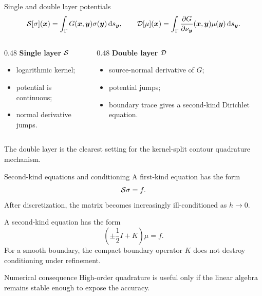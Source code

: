 \documentclass[aspectratio=169,11pt]{beamer}
\newcommand{\dd}{\,\mathrm d}
\newcommand{\x}{\bm{x}}
\newcommand{\y}{\bm{y}}
\begin{document}
\begin{frame}{Single and double layer potentials}
\small
\[
  \Sop[\sigma](\x)
  =
  \int_\Gamma G(\x,\y)\sigma(\y)\dd s_{\y},
  \qquad
  \Dop[\mu](\x)
  =
  \int_\Gamma
  \frac{\partial G}{\partial \nu_{\y}}(\x,\y)\mu(\y)\dd s_{\y}.
\]

\begin{columns}[T,totalwidth=\textwidth]
\begin{column}{0.48\textwidth}
\textbf{Single layer $\mathcal{S}$}
\begin{itemize}
  \item logarithmic kernel;
  \item potential is continuous;
  \item normal derivative jumps.
\end{itemize}
\end{column}
\begin{column}{0.48\textwidth}
\textbf{Double layer $\mathcal{D}$}
\begin{itemize}
  \item source-normal derivative of $G$;
  \item potential jumps;
  \item boundary trace gives a second-kind Dirichlet equation.
\end{itemize}
\end{column}
\end{columns}

\vspace{3mm}
The double layer is the clearest setting for the kernel-split contour
quadrature mechanism.
\end{frame}

\begin{frame}{Second-kind equations and conditioning}
\small
A first-kind equation has the form
\[
  \mathcal{S}\sigma=f.
\]
After discretization, the matrix becomes increasingly ill-conditioned as $h\to0$.

\vspace{2mm}
A second-kind equation has the form
\[
  \left(\pm\frac12 I+K\right)\mu=f.
\]
For a smooth boundary, the compact boundary operator $K$ does not destroy conditioning under refinement.

\begin{block}{Numerical consequence}
High-order quadrature is useful only if the linear algebra remains stable enough to expose the accuracy.
\end{block}
\end{frame}
\end{document}
